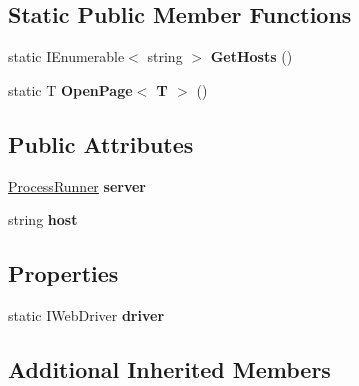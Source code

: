 \subsection*{Static Public Member Functions}
\begin{DoxyCompactItemize}
\item 
\hypertarget{class_proto_test_1_1_golem_1_1_appium_1_1_appium_test_base_a3e3d79104e070dc3e668488ee19cd687}{static I\-Enumerable$<$ string $>$ {\bfseries Get\-Hosts} ()}\label{class_proto_test_1_1_golem_1_1_appium_1_1_appium_test_base_a3e3d79104e070dc3e668488ee19cd687}

\item 
\hypertarget{class_proto_test_1_1_golem_1_1_appium_1_1_appium_test_base_a83bc1a6168841bbe0835887c8c7dc921}{static T {\bfseries Open\-Page$<$ T $>$} ()}\label{class_proto_test_1_1_golem_1_1_appium_1_1_appium_test_base_a83bc1a6168841bbe0835887c8c7dc921}

\end{DoxyCompactItemize}
\subsection*{Public Attributes}
\begin{DoxyCompactItemize}
\item 
\hyperlink{class_proto_test_1_1_golem_1_1_core_1_1_process_runner}{Process\-Runner} {\bfseries server}
\item 
\hypertarget{class_proto_test_1_1_golem_1_1_appium_1_1_appium_test_base_a76bde2a44f473e36ab3193fa0589059c}{string {\bfseries host}}\label{class_proto_test_1_1_golem_1_1_appium_1_1_appium_test_base_a76bde2a44f473e36ab3193fa0589059c}

\end{DoxyCompactItemize}
\subsection*{Properties}
\begin{DoxyCompactItemize}
\item 
\hypertarget{class_proto_test_1_1_golem_1_1_appium_1_1_appium_test_base_a06ae6d42b634fe646e20540ccb267498}{static I\-Web\-Driver {\bfseries driver}}\label{class_proto_test_1_1_golem_1_1_appium_1_1_appium_test_base_a06ae6d42b634fe646e20540ccb267498}

\end{DoxyCompactItemize}
\subsection*{Additional Inherited Members}


